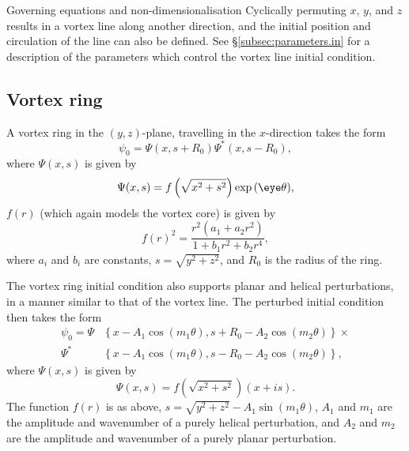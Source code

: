 \begin{chapter}{\label{cha:equations}Governing equations and
  non-dimensionalisation}
  Cyclically permuting $x$, $y$, and $z$ results in a vortex line along another
  direction, and the initial position and circulation of the line can also be
  defined.  See \S\ref{subsec:parameters.in} for a description of the
  parameters which control the vortex line initial condition.

  \subsection{Vortex ring}
  A vortex ring in the $(y,z)$-plane, travelling in the $x$-direction takes the
  form \citep{Berloff04}
  \begin{equation*}
    \psi_{0} = \Psi(x, s+R_{0}) \Psi^{*}(x, s-R_{0}),
  \end{equation*}
  where $\Psi(x,s)$ is given by
  \begin{equation*}
    \Psi(x,s) = f\left( \sqrt{x^{2}+s^{2}} \right) \exp{(\eye \theta)},
  \end{equation*}
  $f(r)$ (which again models the vortex core) is given by
  \begin{equation*}
    f(r)^{2} = \frac{r^{2}\left( a_{1} + a_{2}r^{2} \right)}{1 + b_{1}r^{2} +
    b_{2}r^{4}},
  \end{equation*}
  where $a_{i}$ and $b_{i}$ are constants, $s = \sqrt{y^{2} + z^{2}}$, and
  $R_{0}$ is the radius of the ring.

  The vortex ring initial condition also supports planar and helical
  perturbations, in a manner similar to that of the vortex line.  The perturbed
  initial condition then takes the form
  \begin{equation*}
    \begin{aligned}
    \psi_{0} = \Psi&\left\{ x-A_{1} \cos{\left( m_{1}\theta \right)},
    s+R_{0}-A_{2} \cos{\left( m_{2}\theta \right)} \right\} \times \\
    \Psi^{*}&\left\{ x-A_{1} \cos{\left( m_{1}\theta \right)},
    s-R_{0}-A_{2} \cos{\left( m_{2}\theta \right)} \right\},
    \end{aligned}
  \end{equation*}
  where $\Psi(x,s)$ is given by
  \begin{equation*}
    \Psi(x,s) = f\left( \sqrt{x^{2}+s^{2}} \right) \left( x+is \right).
  \end{equation*}
  The function $f(r)$ is as above, $s = \sqrt{y^{2} + z^{2}} - A_{1}\sin{\left(
  m_{1}\theta \right)}$, $A_{1}$ and $m_{1}$ are the amplitude and wavenumber
  of a purely helical perturbation, and $A_{2}$ and $m_{2}$ are the amplitude
  and wavenumber of a purely planar perturbation.


\end{chapter}
